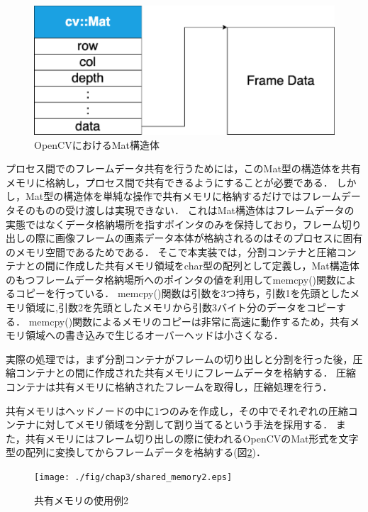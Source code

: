 \begin{figure}[H]
    \hspace*{\fill}
    \includegraphics[width=120mm]{./fig/chap3/mat.eps}
    \hspace*{\fill}
    \caption{OpenCVにおけるMat構造体}
    \label{mat}
\end{figure}

プロセス間でのフレームデータ共有を行うためには，このMat型の構造体を共有メモリに格納し，プロセス間で共有できるようにすることが必要である．
しかし，Mat型の構造体を単純な操作で共有メモリに格納するだけではフレームデータそのものの受け渡しは実現できない．
これはMat構造体はフレームデータの実態ではなくデータ格納場所を指すポインタのみを保持しており，フレーム切り出しの際に画像フレームの画素データ本体が格納されるのはそのプロセスに固有のメモリ空間であるためである．
そこで本実装では，分割コンテナと圧縮コンテナとの間に作成した共有メモリ領域をchar型の配列として定義し，Mat構造体のもつフレームデータ格納場所へのポインタの値を利用してmemcpy()関数によるコピーを行っている．
memcpy()関数は引数を3つ持ち，引数1を先頭としたメモリ領域に,引数2を先頭としたメモリから引数3バイト分のデータをコピーする．
memcpy()関数によるメモリのコピーは非常に高速に動作するため，共有メモリ領域への書き込みで生じるオーバーヘッドは小さくなる．

実際の処理では，まず分割コンテナがフレームの切り出しと分割を行った後，圧縮コンテナとの間に作成された共有メモリにフレームデータを格納する．
圧縮コンテナは共有メモリに格納されたフレームを取得し，圧縮処理を行う．

共有メモリはヘッドノードの中に1つのみを作成し，その中でそれぞれの圧縮コンテナに対してメモリ領域を分割して割り当てるという手法を採用する．
また，共有メモリにはフレーム切り出しの際に使われるOpenCVのMat形式を文字型の配列に変換してからフレームデータを格納する(図\ref{shared_memory2})．

\begin{figure}[H]
    \hspace*{\fill}
    \texttt{[image: ./fig/chap3/shared\_memory2.eps]}
    \hspace*{\fill}
    \caption{共有メモリの使用例2}
    \label{shared_memory2}
\end{figure}

